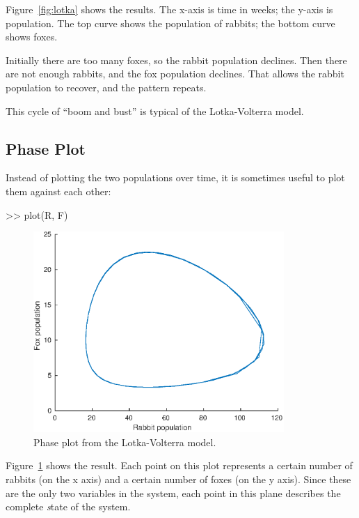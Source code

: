 Figure~\ref{fig:lotka} shows the results. The x-axis is time in weeks; the y-axis is population.  The top curve shows the population of rabbits; the bottom curve shows foxes.


Initially there are too many foxes, so the rabbit population declines.  Then there are not enough rabbits, and the fox population declines.  That allows the rabbit population to recover, and the pattern repeats.

This cycle of ``boom and bust'' is typical of the Lotka-Volterra model.


\subsection{Phase Plot}

Instead of plotting the two populations over time, it is sometimes useful to plot them against each other:

\begin{code}
>> plot(R, F)
\end{code}
\begin{figure}[ht]

\centerline{\includegraphics[height=3in]{book/figs/phase.eps}}
\caption{Phase plot from the Lotka-Volterra model.}
\label{fig:phase}
\end{figure}

Figure~\ref{fig:phase} shows the result.  Each point on this plot represents a certain number of rabbits (on the
x axis) and a certain number of foxes (on the y axis).
Since these are the only two variables in the system, each point in
this plane describes the complete {\emph state} of the system.


